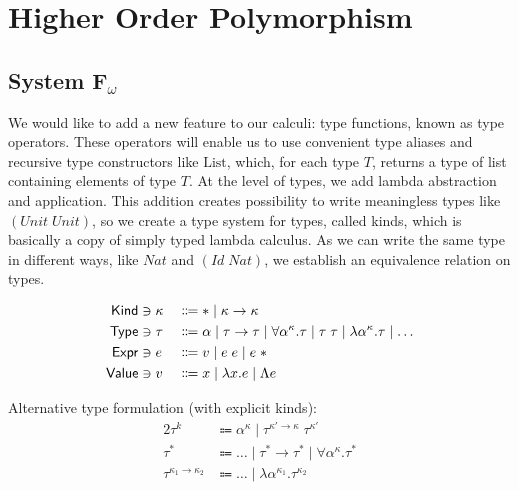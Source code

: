 \chapter{Higher Order Polymorphism}

\section{System F\texorpdfstring{$_\omega$}{omega}}

We would like to add a new feature to our calculi: type functions, known as type operators.
These operators will enable us to use convenient type aliases and recursive type constructors
like $\text{List}$, which, for each type $T$, returns a type of list containing elements of type $T$.
At the level of types, we add lambda abstraction and application. This addition creates
possibility to write meaningless types like $(Unit\; Unit)$, so we create a type system
for types, called kinds, which is basically a copy of simply typed lambda calculus.
As we can write the same type in different ways, like $Nat$ and $(Id\; Nat)$, we establish
an equivalence relation on types.

\begin{alignat*}{2}
  \mathsf{Kind} & \ni \kappa && \Coloneqq * \mid \kappa \to \kappa \\
  \mathsf{Type} & \ni \tau   && \Coloneqq \alpha \mid \tau \to \tau \mid
    \forall\alpha^\kappa.\tau \mid \tau\;\tau \mid \lambda\alpha^\kappa.\tau \mid \dots \\
  \mathsf{Expr} & \ni e      && \Coloneqq v \mid e\;e \mid e\;* \\
  \mathsf{Value} & \ni v     && \Coloneqq x \mid \lambda x.e \mid \Lambda e
\end{alignat*}

Alternative type formulation (with explicit kinds):
\begin{alignat*}{2}
  \tau^k & \Coloneqq \alpha^\kappa \mid \tau^{\kappa'\to\kappa}\;\tau^{\kappa'} \\
  \tau^* & \Coloneqq \dots \mid \tau^* \to \tau^* \mid \forall\alpha^\kappa.\tau^* \\
  \tau^{\kappa_1\to\kappa_2} & \Coloneqq \dots \mid \lambda\alpha^{\kappa_1}.\tau^{\kappa_2}
\end{alignat*}

